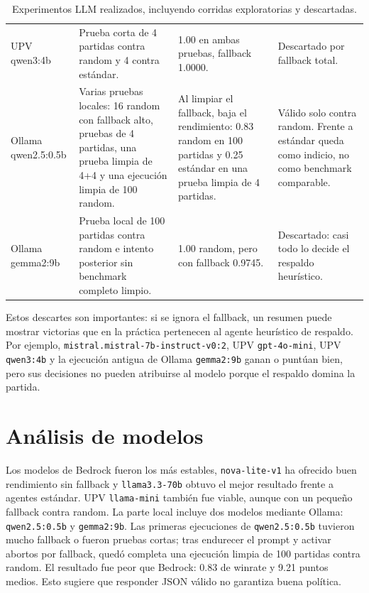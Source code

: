 ﻿\documentclass[10pt,a4paper]{article}
\begin{document}
\begin{table}[H]
\begin{tabular}{L{2.7cm}L{4.3cm}L{4.6cm}L{4.4cm}}
\addlinespace[0.25em]
UPV qwen3:4b & Prueba corta de 4 partidas contra random y 4 contra estándar. & 1.00 en ambas pruebas, fallback 1.0000. & Descartado por fallback total. \\
\addlinespace[0.25em]
Ollama qwen2.5:0.5b & Varias pruebas locales: 16 random con fallback alto, pruebas de 4 partidas, una prueba limpia de 4+4 y una ejecución limpia de 100 random. & Al limpiar el fallback, baja el rendimiento: 0.83 random en 100 partidas y 0.25 estándar en una prueba limpia de 4 partidas. & Válido solo contra random. Frente a estándar queda como indicio, no como benchmark comparable. \\
\addlinespace[0.25em]
Ollama gemma2:9b & Prueba local de 100 partidas contra random e intento posterior sin benchmark completo limpio. & 1.00 random, pero con fallback 0.9745. & Descartado: casi todo lo decide el respaldo heurístico. \\
\bottomrule
\end{tabular}
\caption{Experimentos LLM realizados, incluyendo corridas exploratorias y descartadas.}
\label{tab:llm_all}
\end{table}

Estos descartes son importantes: si se ignora el fallback, un resumen puede mostrar victorias que en la práctica pertenecen al agente heurístico de respaldo. Por ejemplo, \texttt{mistral.mistral-7b-instruct-v0:2}, UPV \texttt{gpt-4o-mini}, UPV \texttt{qwen3:4b} y la ejecución antigua de Ollama \texttt{gemma2:9b} ganan o puntúan bien, pero sus decisiones no pueden atribuirse al modelo porque el respaldo domina la partida.

\section{Análisis de modelos}
Los modelos de Bedrock fueron los más estables, \texttt{nova-lite-v1} ha ofrecido buen rendimiento sin fallback y \texttt{llama3.3-70b} obtuvo el mejor resultado frente a agentes estándar. UPV \texttt{llama-mini} también fue viable, aunque con un pequeño fallback contra random. La parte local incluye dos modelos mediante Ollama: \texttt{qwen2.5:0.5b} y \texttt{gemma2:9b}. Las primeras ejecuciones de \texttt{qwen2.5:0.5b} tuvieron mucho fallback o fueron pruebas cortas; tras endurecer el prompt y activar abortos por fallback, quedó completa una ejecución limpia de 100 partidas contra random. El resultado fue peor que Bedrock: 0.83 de winrate y 9.21 puntos medios. Esto sugiere que responder JSON válido no garantiza buena política.
\end{document}
